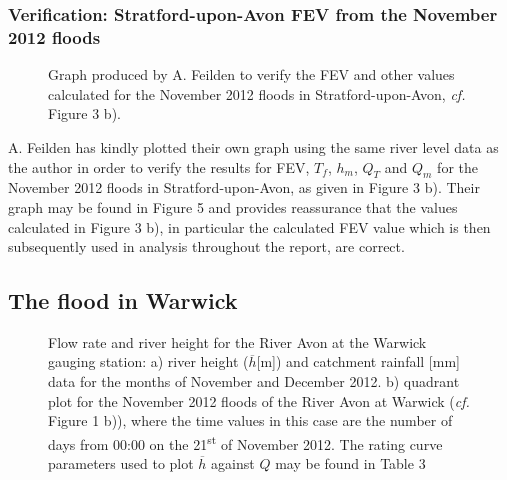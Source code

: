 \documentclass[11pt,a4paper]{article}
\begin{document}
\subsubsection{Verification: Stratford-upon-Avon FEV from the November 2012 floods}
\begin{figure}[ht!]
\centering
{}
\caption{Graph produced by A. Feilden to verify the FEV and other values calculated for the November 2012 floods in Stratford-upon-Avon, \textit{cf.} Figure 3 b).}
\end{figure}
A. Feilden has kindly plotted their own graph using the same river level data as the author in order to verify the results for FEV, $T_f$, $h_m$, $Q_T$ and $Q_m$ for the November 2012 floods in Stratford-upon-Avon, as given in Figure 3 b). Their graph may be found in Figure 5 and provides reassurance that the values calculated in Figure 3 b), in particular the calculated FEV value which is then subsequently used in analysis throughout the report, are correct.

\subsection{The flood in Warwick}
\begin{figure}[ht!]
\centering
{}
\hfill
{}
\caption{Flow rate and river height for the River Avon at the Warwick gauging station: a) river height ($\overline{h}$[m]) \cite{EA} and catchment rainfall [mm] data \cite{NRFA} for the months of November and December 2012. b) quadrant plot for the November 2012 floods of the River Avon at Warwick (\textit{cf.} Figure 1 b)), where the time values in this case are the number of days from 00:00 on the 21\textsuperscript{st} of November 2012. The rating curve parameters used to plot $\overline{h}$ against $Q$ may be found in Table 3}
\end{figure}
\end{document}
